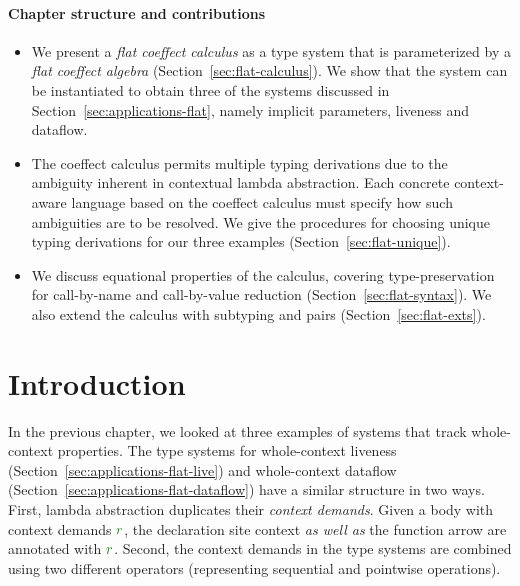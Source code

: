 \paragraph{Chapter structure and contributions}
\begin{itemize}
\item We present a \emph{flat coeffect calculus} as a type system that is parameterized by a
  \emph{flat coeffect algebra} (Section~\ref{sec:flat-calculus}). We show that the system can be
  instantiated to obtain three of the systems discussed in Section~\ref{sec:applications-flat},
  namely implicit parameters, liveness and dataflow.

\item The coeffect calculus permits multiple typing derivations due to the ambiguity inherent
  in contextual lambda abstraction. Each concrete context-aware language based on the
  coeffect calculus must specify how such ambiguities are to be resolved. We give the procedures for
  choosing unique typing derivations for our three examples (Section~\ref{sec:flat-unique}).

\item We discuss equational properties of the calculus, covering type-pre\-ser\-vation for call-by-name
  and call-by-value reduction (Section~\ref{sec:flat-syntax}). We also extend the calculus
  with subtyping and pairs (Section~\ref{sec:flat-exts}).
\end{itemize}

%
%

\section{Introduction}
\label{sec:flat-intro}

In the previous chapter, we looked at three examples of systems that track whole-context
properties. The type systems for whole-context liveness (Section~\ref{sec:applications-flat-live})
and whole-context dataflow (Section~\ref{sec:applications-flat-dataflow}) have a similar
structure in two ways. First, lambda abstraction duplicates their \emph{context demands}. Given a
body with context demands $\cclrd{r}$, the declaration site context \emph{as well as} the function
arrow are annotated with $\cclrd{r}$. Second, the context demands in the type systems are combined
using two different operators (representing sequential and pointwise operations).

